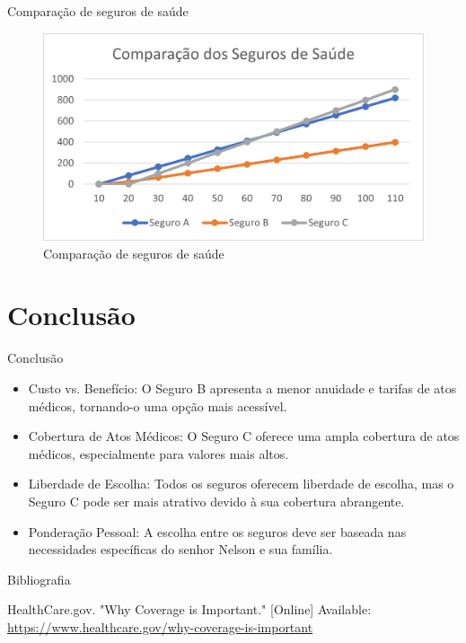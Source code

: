 \documentclass[10pt]{beamer}
\begin{document}
\begin{frame}{Comparação de seguros de saúde}
    \begin{figure}
        \centering
        \includegraphics[scale=0.5]{graph}
        \caption{Comparação de seguros de saúde}
    \end{figure}
\end{frame}

\section{Conclusão}
\begin{frame}{Conclusão}
    \begin{itemize}
        \item Custo vs. Benefício: O Seguro B apresenta a menor anuidade e tarifas de atos médicos, tornando-o uma opção mais acessível.
        \item Cobertura de Atos Médicos: O Seguro C oferece uma ampla cobertura de atos médicos, especialmente para valores mais altos.
        \item Liberdade de Escolha: Todos os seguros oferecem liberdade de escolha, mas o Seguro C pode ser mais atrativo devido à sua cobertura abrangente.
        \item Ponderação Pessoal: A escolha entre os seguros deve ser baseada nas necessidades específicas do senhor Nelson e sua família.
    \end{itemize}
\end{frame}

\begin{frame}{Bibliografia}
    \begin{thebibliography}{9}
        HealthCare.gov. "Why Coverage is Important." [Online]
        Available: \url{https://www.healthcare.gov/why-coverage-is-important}
    \end{thebibliography}
\end{frame}
\end{document}
